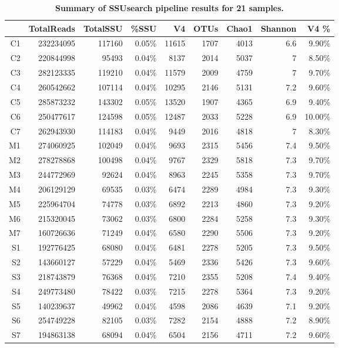 \documentclass[]{msu-thesis}
\begin{document}
\begin{table}[htbp]
  \centering
  \caption[Summary of SSUsearch pipeline results for 21
  samples]{\textbf{Summary of SSUsearch pipeline results for 21
  samples.}}
    \begin{tabular}{|rrrrrrrrr|}
    \toprule
          & TotalReads & TotalSSU & \%SSU & V4    & OTUs  & Chao1 & Shannon & V4 \% \\
    \midrule
    C1    & 232234095 & 117160 & 0.05\% & 11615 & 1707  & 4013  & 6.6   & 9.90\% \\
    C2    & 220844998 & 95493 & 0.04\% & 8137  & 2014  & 5037  & 7     & 8.50\% \\
    C3    & 282123335 & 119210 & 0.04\% & 11579 & 2009  & 4759  & 7     & 9.70\% \\
    C4    & 260542662 & 107114 & 0.04\% & 10295 & 2146  & 5131  & 7.2   & 9.60\% \\
    C5    & 285873232 & 143302 & 0.05\% & 13520 & 1907  & 4365  & 6.9   & 9.40\% \\
    C6    & 250477617 & 124598 & 0.05\% & 12487 & 2033  & 5228  & 6.9   & 10.00\% \\
    C7    & 262943930 & 114183 & 0.04\% & 9449  & 2016  & 4818  & 7     & 8.30\% \\
    M1    & 274060925 & 102049 & 0.04\% & 9693  & 2315  & 5456  & 7.4   & 9.50\% \\
    M2    & 278278868 & 100498 & 0.04\% & 9767  & 2329  & 5818  & 7.3   & 9.70\% \\
    M3    & 244772969 & 92624 & 0.04\% & 8963  & 2245  & 5358  & 7.3   & 9.70\% \\
    M4    & 206129129 & 69535 & 0.03\% & 6474  & 2289  & 4984  & 7.3   & 9.30\% \\
    M5    & 225964704 & 74778 & 0.03\% & 6892  & 2213  & 4860  & 7.3   & 9.20\% \\
    M6    & 215320045 & 73062 & 0.03\% & 6800  & 2284  & 5258  & 7.3   & 9.30\% \\
    M7    & 160726636 & 71249 & 0.04\% & 6580  & 2290  & 5506  & 7.3   & 9.20\% \\
    S1    & 192776425 & 68080 & 0.04\% & 6481  & 2278  & 5205  & 7.3   & 9.50\% \\
    S2    & 143660127 & 57229 & 0.04\% & 5469  & 2336  & 5426  & 7.3   & 9.60\% \\
    S3    & 218743879 & 76368 & 0.04\% & 7210  & 2355  & 5208  & 7.4   & 9.40\% \\
    S4    & 249773480 & 78422 & 0.03\% & 7215  & 2278  & 5364  & 7.3   & 9.20\% \\
    S5    & 140239637 & 49962 & 0.04\% & 4598  & 2086  & 4639  & 7.1   & 9.20\% \\
    S6    & 254749228 & 82105 & 0.03\% & 7282  & 2154  & 4888  & 7.2   & 8.90\% \\
    S7    & 194863138 & 68094 & 0.04\% & 6504  & 2156  & 4711  & 7.2   & 9.60\% \\
    \bottomrule
    \end{tabular}%
  \label{tab:chap4TabS2}%
\end{table}%
\end{document}
